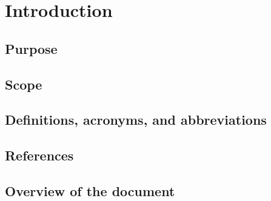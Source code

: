 \chapter{Introduction} \label{chap:introduction}


\section{Purpose}
\lipsum[1]


\section{Scope}
\lipsum[2]


\section{Definitions, acronyms, and abbreviations}
\lipsum[3]


\section{References}
\lipsum[4]


\section{Overview of the document}	
\lipsum[5]
